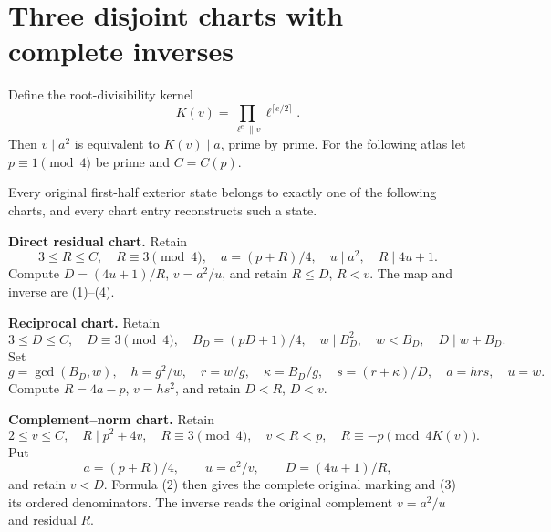 \section{Three disjoint charts with complete inverses}
Define the root-divisibility kernel
\[
 K(v)=\prod_{\ell^e\parallel v}\ell^{\lceil e/2\rceil}.
\]
Then $v\mid a^2$ is equivalent to $K(v)\mid a$, prime by prime.
For the following atlas let $p\equiv1\pmod4$ be prime and $C=C(p)$.

\begin{theorem}\label{thm:atlas}
Every original first-half exterior state belongs to exactly one of the following
charts, and every chart entry reconstructs such a state.

\textbf{Direct residual chart.} Retain
\[
 3\le R\le C,\quad R\equiv3\pmod4,\quad a=(p+R)/4,
 \quad u\mid a^2,\quad R\mid4u+1.
\]
Compute $D=(4u+1)/R$, $v=a^2/u$, and retain $R\le D$, $R<v$.
The map and inverse are (1)--(4).

\textbf{Reciprocal chart.} Retain
\[
 3\le D\le C,\quad D\equiv3\pmod4,\quad B_D=(pD+1)/4,
 \quad w\mid B_D^2,\quad w<B_D,\quad D\mid w+B_D.
\]
Set
\[
 g=\gcd(B_D,w),\quad
 h=g^2/w,\quad r=w/g,\quad\kappa=B_D/g,
 \quad s=(r+\kappa)/D,\quad a=hrs,\quad u=w.
\]
Compute $R=4a-p$, $v=hs^2$, and retain $D<R$, $D<v$.

\textbf{Complement--norm chart.} Retain
\[
 \boxed{2\le v\le C,\quad R\mid p^2+4v,\quad
 R\equiv3\pmod4,\quad v<R<p,\quad
 R\equiv-p\pmod{4K(v)}.}                               \tag{12}
\]
Put
\[
 \boxed{a=(p+R)/4,\qquad u=a^2/v,\qquad
 D=(4u+1)/R,}                                           \tag{13}
\]
and retain $v<D$. Formula (2) then gives the complete original marking and (3)
its ordered denominators. The inverse reads the original complement $v=a^2/u$
and residual $R$.
\end{theorem}
